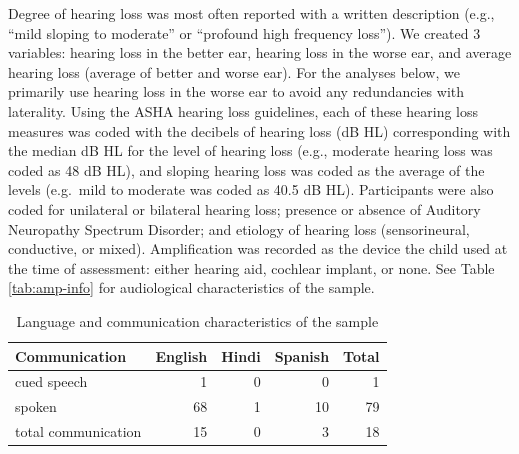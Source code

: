 \documentclass[english,man]{apa6}
\begin{document}
\begin{table}[!h]

\caption{\label{tab:amp-info}Audiological Characteristics of the Sample}
\centering
{}
\end{table}

Degree of hearing loss was most often reported with a written description (e.g., \enquote{mild sloping to moderate} or \enquote{profound high frequency loss}). We created 3 variables: hearing loss in the better ear, hearing loss in the worse ear, and average hearing loss (average of better and worse ear). For the analyses below, we primarily use hearing loss in the worse ear to avoid any redundancies with laterality. Using the ASHA hearing loss guidelines, each of these hearing loss measures was coded with the decibels of hearing loss (dB HL) corresponding with the median dB HL for the level of hearing loss (e.g., moderate hearing loss was coded as 48 dB HL), and sloping hearing loss was coded as the average of the levels (e.g.~mild to moderate was coded as 40.5 dB HL). Participants were also coded for unilateral or bilateral hearing loss; presence or absence of Auditory Neuropathy Spectrum Disorder; and etiology of hearing loss (sensorineural, conductive, or mixed). Amplification was recorded as the device the child used at the time of assessment: either hearing aid, cochlear implant, or none. See Table \ref{tab:amp-info} for audiological characteristics of the sample.

\begin{table}[!h]

\caption{\label{tab:comm-info}Language and communication characteristics of the sample}
\centering
\begin{tabular}[t]{l|r|r|r|r}
\hline
Communication & English & Hindi & Spanish & Total\\
\hline
cued speech & 1 & 0 & 0 & 1\\
\hline
spoken & 68 & 1 & 10 & 79\\
\hline
total communication & 15 & 0 & 3 & 18\\
\hline
\end{tabular}
\end{table}
\end{document}
